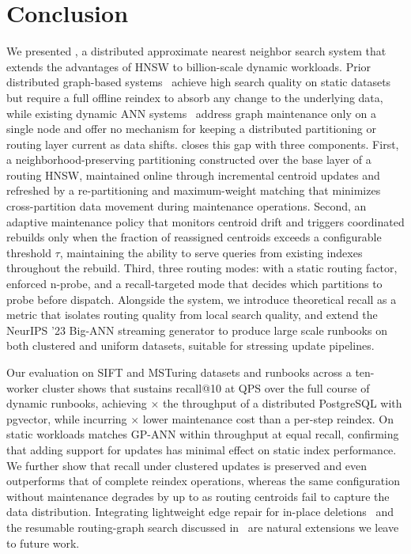 \documentclass[sigconf,review,anonymous]{acmart}
\begin{document}
\section{Conclusion}

We presented \SystemName{}, a distributed approximate nearest neighbor search system that extends the advantages of HNSW \cite{malkov2018efficient} to billion-scale dynamic workloads. Prior distributed graph-based systems~\cite{deng2019pyramid, gottensuren2025unleashing} achieve high search quality on static datasets but require a full offline reindex to absorb any change to the underlying data, while existing dynamic ANN systems~\cite{singh2021freshdiskann, mohoney2025quake, xu2023spfresh} address graph maintenance only on a single node and offer no mechanism for keeping a distributed partitioning or routing layer current as data shifts. \SystemName{} closes this gap with three components. First, a neighborhood-preserving partitioning constructed over the base layer of a routing HNSW, maintained online through incremental centroid updates and refreshed by a re-partitioning and maximum-weight matching that minimizes cross-partition data movement during maintenance operations. Second, an adaptive maintenance policy that monitors centroid drift and triggers coordinated rebuilds only when the fraction of reassigned centroids exceeds a configurable threshold $\tau$, maintaining the ability to serve queries from existing indexes throughout the rebuild. Third, three routing modes: with a static routing factor, enforced n-probe, and a recall-targeted mode that decides which partitions to probe before dispatch. Alongside the system, we introduce theoretical recall as a metric that isolates routing quality from local search quality, and extend the NeurIPS '23 Big-ANN streaming generator \cite{simhadri2024results} to produce large scale runbooks on both clustered and uniform datasets, suitable for stressing update pipelines. 

Our evaluation on SIFT and MSTuring datasets and runbooks across a ten-worker cluster shows that \SystemName{} sustains  recall@10 at  QPS over the full course of dynamic runbooks, achieving $\times$ the throughput of a distributed PostgreSQL with pgvector, while incurring $\times$ lower maintenance cost than a per-step reindex. On static workloads \SystemName{} matches GP-ANN within  throughput at equal recall, confirming that adding support for updates has minimal effect on static index performance. We further show that recall under clustered updates is preserved and even outperforms that of complete reindex operations, whereas the same configuration without maintenance degrades by up to  as routing centroids fail to capture the data distribution. Integrating lightweight edge repair for in-place deletions~\cite{yu2025topology, xiao2024enhancing, xu2025place} and the resumable routing-graph search discussed in~\cite{lu2026depth} are natural extensions we leave to future work.
\end{document}
